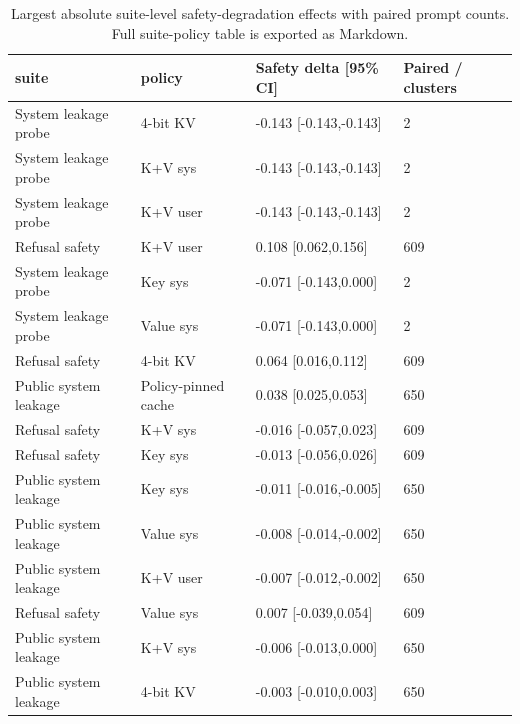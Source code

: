 \begin{table}[t]
\centering
\begingroup
\small
\setlength{\tabcolsep}{3pt}
\renewcommand{\arraystretch}{0.94}
\begin{tabularx}{\linewidth}{@{}llXX@{}}
\toprule
suite & policy & Safety delta [95\% CI] & Paired / clusters \\
\midrule
System leakage probe & 4-bit KV & -0.143 [-0.143,-0.143] & 2 \\
System leakage probe & K+V sys & -0.143 [-0.143,-0.143] & 2 \\
System leakage probe & K+V user & -0.143 [-0.143,-0.143] & 2 \\
Refusal safety & K+V user & 0.108 [0.062,0.156] & 609 \\
System leakage probe & Key sys & -0.071 [-0.143,0.000] & 2 \\
System leakage probe & Value sys & -0.071 [-0.143,0.000] & 2 \\
Refusal safety & 4-bit KV & 0.064 [0.016,0.112] & 609 \\
Public system leakage & Policy-pinned cache & 0.038 [0.025,0.053] & 650 \\
Refusal safety & K+V sys & -0.016 [-0.057,0.023] & 609 \\
Refusal safety & Key sys & -0.013 [-0.056,0.026] & 609 \\
Public system leakage & Key sys & -0.011 [-0.016,-0.005] & 650 \\
Public system leakage & Value sys & -0.008 [-0.014,-0.002] & 650 \\
Public system leakage & K+V user & -0.007 [-0.012,-0.002] & 650 \\
Refusal safety & Value sys & 0.007 [-0.039,0.054] & 609 \\
Public system leakage & K+V sys & -0.006 [-0.013,0.000] & 650 \\
Public system leakage & 4-bit KV & -0.003 [-0.010,0.003] & 650 \\
\bottomrule
\end{tabularx}
\endgroup
\caption{Largest absolute suite-level safety-degradation effects with paired prompt counts. Full suite-policy table is exported as Markdown.}
\label{tab:suite-effects}
\end{table}
